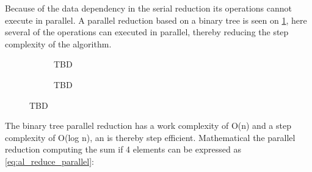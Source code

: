 Because of the data dependency in the serial reduction its operations cannot execute in parallel. A parallel reduction based on a binary tree is seen on \cref{fig:reduce_parallel}, here several of the operations can executed in parallel, thereby reducing the step complexity of the algorithm. 

\begin{figure}[ht]
	\centering
	\begin{subfigure}{.5\textwidth}
		\centering
		\caption{TBD}
		\label{fig:reduce_parallel}
	\end{subfigure}%
	\begin{subfigure}{.5\textwidth}
		\centering
		\caption{TBD}
		\label{fig:reduce_parallel_example}
	\end{subfigure}
	\caption{TBD}
	\label{fig:reduce_parallel_fig}
\end{figure}

The binary tree parallel reduction has a work complexity of O(n) and a step complexity of O(log n), an is thereby step efficient. Mathematical the parallel reduction computing the sum if 4 elements can be expressed as \cref{eq:al_reduce_parallel}: 


